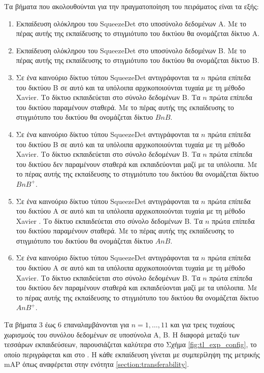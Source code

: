 Τα βήματα που ακολουθούνται για την πραγματοποίηση του πειράματος είναι τα εξής:
\begin{enumerate}
\item Εκπαίδευση ολόκληρου του SqueezeDet στο υποσύνολο δεδομένων Α. Με το πέρας αυτής της εκπαίδευσης το στιγμιότυπο του δικτύου θα ονομάζεται δίκτυο A.
\item Εκπαίδευση ολόκληρου του SqueezeDet στο υποσύνολο δεδομένων B. Με το πέρας αυτής της εκπαίδευσης το στιγμιότυπο του δικτύου θα ονομάζεται δίκτυο B.

\item{Σε ένα καινούριο δίκτυο τύπου SqueezeDet αντιγράφονται τα $n$ πρώτα επίπεδα του δικτύου B σε αυτό και τα υπόλοιπα αρχικοποιούνται τυχαία με τη μέθοδο Xavier. Το δίκτυο εκπαιδεύεται στο σύνολο δεδομένων B. Τα $n$ πρώτα επίπεδα του δικτύου παραμένουν σταθερά. Με το πέρας αυτής της εκπαίδευσης το στιγμιότυπο του δικτύου θα ονομάζεται δίκτυο $BnB$.}

\item{Σε ένα καινούριο δίκτυο τύπου SqueezeDet αντιγράφονται τα $n$ πρώτα επίπεδα του δικτύου B σε αυτό και τα υπόλοιπα αρχικοποιούνται τυχαία με τη μέθοδο Xavier. Το δίκτυο εκπαιδεύεται στο σύνολο δεδομένων B. Τα $n$ πρώτα επίπεδα του δικτύου δεν παραμένουν σταθερά και εκπαιδεύονται μαζί με τα υπόλοιπα. Με το πέρας αυτής της εκπαίδευσης το στιγμιότυπο του δικτύου θα ονομάζεται δίκτυο $BnB^+$.}

\item{Σε ένα καινούριο δίκτυο τύπου SqueezeDet αντιγράφονται τα $n$ πρώτα επίπεδα του δικτύου A σε αυτό και τα υπόλοιπα αρχικοποιούνται τυχαία με τη μέθοδο Xavier \cite{77}. Το δίκτυο εκπαιδεύεται στο σύνολο δεδομένων B. Τα $n$ πρώτα επίπεδα του δικτύου παραμένουν σταθερά. Με το πέρας αυτής της εκπαίδευσης το στιγμιότυπο του δικτύου θα ονομάζεται δίκτυο $AnB$.}

\item{Σε ένα καινούριο δίκτυο τύπου SqueezeDet αντιγράφονται τα $n$ πρώτα επίπεδα του δικτύου A σε αυτό και τα υπόλοιπα αρχικοποιούνται τυχαία με τη μέθοδο Xavier. Το δίκτυο εκπαιδεύεται στο σύνολο δεδομένων B. Τα $n$ πρώτα επίπεδα του δικτύου δεν παραμένουν σταθερά και εκπαιδεύονται μαζί με τα υπόλοιπα. Με το πέρας αυτής της εκπαίδευσης το στιγμιότυπο του δικτύου θα ονομάζεται δίκτυο $AnB^+$.}

\end{enumerate}

Τα βήματα 3 έως 6 επαναλαμβάνονται για $n = 1,\hdots,11$ και για τρεις τυχαίους χωρισμούς του συνόλου δεδομένων σε υποσύνολα A, B. Η διαφορά μεταξύ των τεσσάρων εκπαιδεύσεων, παρουσιάζεται καλύτερα στο Σχήμα \ref{fig:tl_exp_config}, το οποίο περιγράφεται και στο \cite{55}. Η κάθε εκπαίδευση γίνεται με συμπερίληψη της μετρικής mAP όπως αναφέρεται στην ενότητα \ref{section:transferability}.


